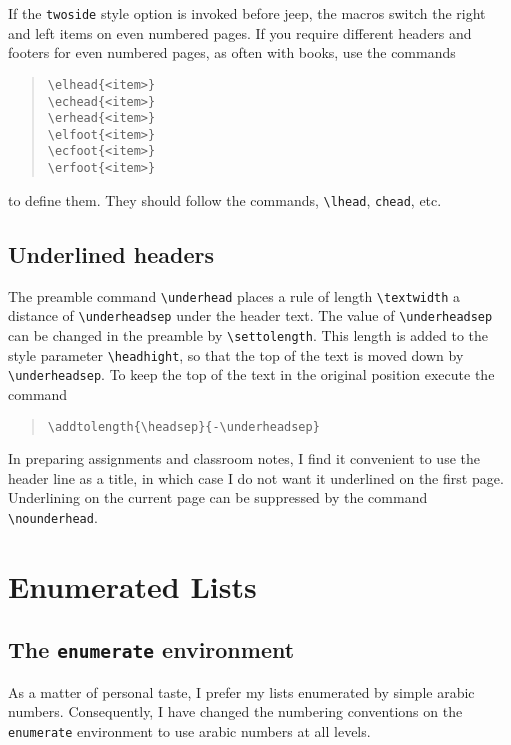 If the \verb|twoside| style option is invoked before jeep, the macros
switch the right and left items on even numbered pages.  If you
require different headers and footers for even numbered pages, as
often with books, use the commands
\begin{quote}
\begin{verbatim}
\elhead{<item>}
\echead{<item>}
\erhead{<item>}
\elfoot{<item>}
\ecfoot{<item>}
\erfoot{<item>}
\end{verbatim}
\end{quote}
to define them.  They should follow the commands, \verb|\lhead|,
\verb|chead|, etc.

\subsection{Underlined headers}

The preamble command \verb|\underhead| places a
rule of length \verb|\textwidth| a distance of
\verb|\underheadsep| under the header text.  The value
of \verb|\underheadsep| can be changed in the preamble by
\verb|\settolength|.  This length is added
to the style parameter \verb|\headhight|, so that the top of the text
is moved down by \verb|\underheadsep|.  To keep the top of the text
in the original position execute the command
\begin{quote}
\begin{verbatim}
\addtolength{\headsep}{-\underheadsep}
\end{verbatim}
\end{quote}


In preparing assignments and classroom notes, I find it convenient to
use the header line as a title, in which case I do not want it
underlined on the first page.  Underlining on the current page can be
suppressed by the command \verb|\nounderhead|.

\section{Enumerated Lists}

\subsection{The {\tt enumerate} environment}

As a matter of personal taste, I prefer my lists enumerated by simple
arabic numbers.  Consequently, I have changed the numbering
conventions on the {\tt enumerate} environment to use arabic numbers
at all levels.

